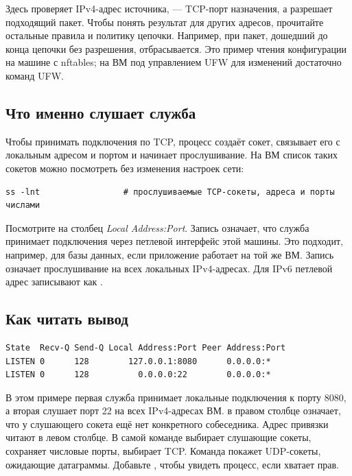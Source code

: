 Здесь  проверяет IPv4-адрес источника, 
--- TCP-порт назначения, а  разрешает подходящий пакет.
Чтобы понять результат для других адресов, прочитайте остальные правила
и политику цепочки. Например, при  пакет, дошедший
до конца цепочки без разрешения, отбрасывается. Это пример чтения
конфигурации на машине с nftables; на ВМ под управлением UFW для
изменений достаточно команд UFW.

\subsection{Что именно слушает служба}

Чтобы принимать подключения по TCP, процесс создаёт сокет, связывает
его с локальным адресом и портом и начинает прослушивание. На ВМ
список таких сокетов можно посмотреть без изменения настроек сети:

\begin{verbatim}
ss -lnt                 # прослушиваемые TCP-сокеты, адреса и порты числами
\end{verbatim}

Посмотрите на столбец \emph{Local Address:Port}. Запись
 означает, что служба принимает подключения через
петлевой интерфейс этой машины. Это подходит, например, для базы данных,
если приложение работает на той же ВМ. Запись 
означает прослушивание на всех локальных IPv4-адресах. Для IPv6
петлевой адрес записывают как .

\subsection{Как читать вывод }

\begin{verbatim}
State  Recv-Q Send-Q Local Address:Port Peer Address:Port
LISTEN 0      128        127.0.0.1:8080      0.0.0.0:*
LISTEN 0      128          0.0.0.0:22        0.0.0.0:*
\end{verbatim}

В этом примере первая служба принимает локальные подключения к порту
8080, а вторая слушает порт 22 на всех IPv4-адресах ВМ.
 в правом столбце означает, что у слушающего сокета
ещё нет конкретного собеседника. Адрес привязки читают в левом
столбце. В самой команде  выбирает слушающие сокеты,
 сохраняет числовые порты,  выбирает TCP.
Команда  покажет UDP-сокеты, ожидающие датаграммы.
Добавьте , чтобы увидеть процесс, если хватает прав.

